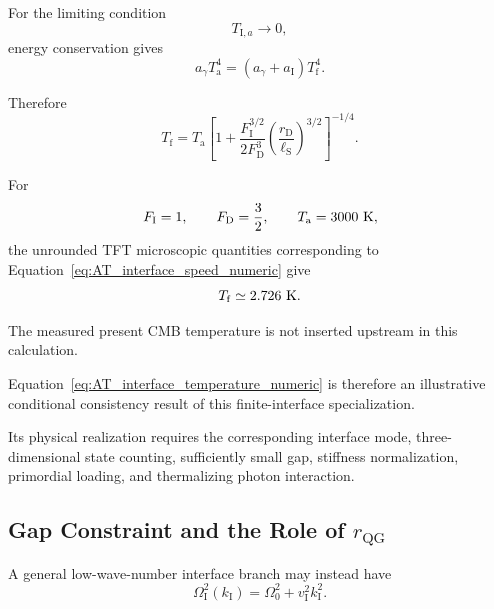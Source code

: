 For the limiting condition
\begin{equation}
    T_{\mathrm I,a}
    \rightarrow
    0,
\end{equation}
energy conservation gives
\begin{equation}
    a_\gamma T_{\mathrm a}^4
    =
    \left(
        a_\gamma+a_{\mathrm I}
    \right)
    T_{\mathrm f}^4.
\end{equation}

Therefore
\begin{equation}
    T_{\mathrm f}
    =
    T_{\mathrm a}
    \left[
        1+
        \frac{
            F_{\mathrm I}^{3/2}
        }{
            2F_{\mathrm D}^3
        }
        \left(
            \frac{
                r_{\mathrm D}
            }{
                \ell_{\mathrm S}
            }
        \right)^{3/2}
    \right]^{-1/4}.
    \label{eq:AT_interface_temperature_formula}
\end{equation}

For
\begin{equation}
    F_{\mathrm I}=1,
    \qquad
    F_{\mathrm D}=\frac32,
    \qquad
    T_{\mathrm a}=3000~{\rm K},
\end{equation}
the unrounded TFT microscopic quantities corresponding to
Equation~\eqref{eq:AT_interface_speed_numeric}
give
\begin{equation}
    T_{\mathrm f}
    \simeq
    2.726~{\rm K}.
    \label{eq:AT_interface_temperature_numeric}
\end{equation}

The measured present CMB temperature is not inserted upstream in this
calculation.

Equation~\eqref{eq:AT_interface_temperature_numeric}
is therefore an illustrative conditional consistency result of this
finite-interface specialization.

Its physical realization requires the corresponding interface mode,
three-dimensional state counting, sufficiently small gap, stiffness
normalization, primordial loading, and thermalizing photon interaction.


\subsection{Gap Constraint and the Role of \(r_{\mathrm{QG}}\)}

A general low-wave-number interface branch may instead have
\begin{equation}
    \Omega_{\mathrm I}^2(k_{\mathrm I})
    =
    \Omega_0^2
    +
    v_{\mathrm I}^2k_{\mathrm I}^2.
    \label{eq:AT_interface_gapped_dispersion}
\end{equation}

